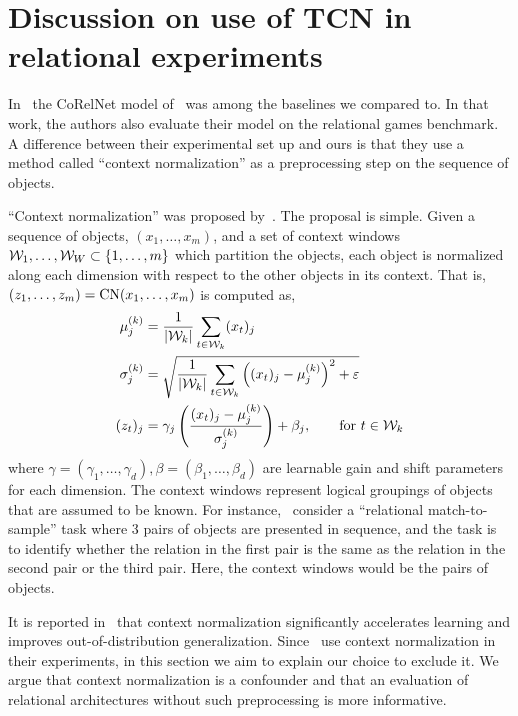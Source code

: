 \section{Discussion on use of TCN in relational experiments}\label{sec:appendix_tcn_discussion}

In~ the CoRelNet model of~\citet{kergNeuralArchitecture2022} was among the baselines we compared to. In that work, the authors also evaluate their model on the relational games benchmark. A difference between their experimental set up and ours is that they use a method called ``context normalization'' as a preprocessing step on the sequence of objects.

``Context normalization'' was proposed by~\citet{webbLearningRepresentationsThat2020}. The proposal is simple. Given a sequence of objects, $(x_1, \ldots, x_m)$, and a set of context windows ${\mathcal{W}}_1, \ldots, {\mathcal{W}}_W \subset \left\{1, \ldots, m\right\}$ which partition the objects, each object is normalized along each dimension with respect to the other objects in its context. That is, $\left(z_1, \ldots, z_m\right) = \mathrm{CN}(x_1, \ldots, x_m)$ is computed as,
\begin{eqnarray*}
    \begin{split}
        \mu_j^{(k)} &= \frac{1}{\left\lvert{\mathcal{W}}_k\right\rvert} \sum_{t \in {\mathcal{W}}_k} (x_t)_j\\
        \sigma_j^{(k)} &= \sqrt{ \frac{1}{\left\lvert{\mathcal{W}}_k\right\rvert} \sum_{t \in {\mathcal{W}}_k} \left((x_t)_j - \mu_j^{(k)}\right)^2 + \varepsilon}\\
        (z_t)_j &= \gamma_j \left(\frac{(x_t)_j - \mu_j^{(k)}}{\sigma_j^{(k)}}\right) + \beta_j, \qquad \text{for } t \in {\mathcal{W}}_k
    \end{split}
\end{eqnarray*}
where $\gamma = (\gamma_1, \ldots, \gamma_d), \beta = (\beta_1, \ldots, \beta_d)$ are learnable gain and shift parameters for each dimension. The context windows represent logical groupings of objects that are assumed to be known. For instance,~\citep{webbEmergentSymbols2021,kergNeuralArchitecture2022} consider a ``relational match-to-sample'' task where 3 pairs of objects are presented in sequence, and the task is to identify whether the relation in the first pair is the same as the relation in the second pair or the third pair. Here, the context windows would be the pairs of objects.

It is reported in~\citep{webbEmergentSymbols2021,kergNeuralArchitecture2022} that context normalization significantly accelerates learning and improves out-of-distribution generalization. Since~\citep{webbEmergentSymbols2021,kergNeuralArchitecture2022} use context normalization in their experiments, in this section we aim to explain our choice to exclude it. We argue that context normalization is a confounder and that an evaluation of relational architectures without such preprocessing is more informative.

